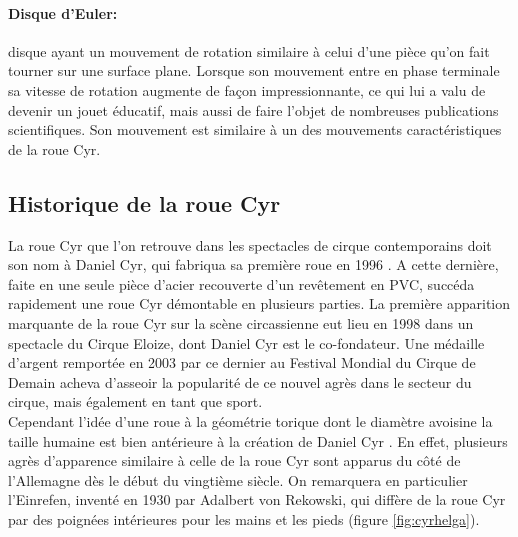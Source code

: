 \paragraph{Disque d'Euler:} disque ayant un mouvement de rotation similaire à celui d'une pièce qu'on fait tourner sur une surface plane. Lorsque son mouvement entre en phase terminale sa vitesse de rotation augmente de façon impressionnante, ce qui lui a valu de devenir un jouet éducatif, mais aussi de faire l'objet de nombreuses publications scientifiques. Son mouvement est similaire à un des mouvements caractéristiques de la roue Cyr.


\subsection{Historique de la roue Cyr}
La roue Cyr que l'on retrouve dans les spectacles de cirque contemporains doit son  nom à Daniel Cyr, qui fabriqua sa première roue en 1996 \cite{Inertie}. A cette dernière, faite en une seule pièce d'acier recouverte d'un revêtement en PVC, succéda rapidement  une roue Cyr démontable en plusieurs parties. La première apparition marquante de la roue Cyr sur la scène circassienne eut lieu en 1998 dans un spectacle du Cirque Eloize, dont Daniel Cyr est le co-fondateur. Une médaille d'argent remportée en 2003 par ce dernier au Festival Mondial du Cirque de Demain acheva d'asseoir la popularité de ce nouvel agrès dans le secteur du cirque, mais également en tant que sport.\\
Cependant l'idée d'une roue à la géométrie torique dont le diamètre avoisine la taille humaine est bien antérieure à la création de Daniel Cyr \cite{Inertiehist,gymmedia,howstuffwork}. En effet, plusieurs agrès d'apparence similaire à celle de la roue Cyr sont apparus du côté de l'Allemagne dès le début du vingtième siècle. On remarquera en particulier l'Einrefen, inventé en 1930 par Adalbert von Rekowski, qui diffère de la roue Cyr par des poignées intérieures pour les mains et les pieds (figure \ref{fig:cyrhelga}). \\

